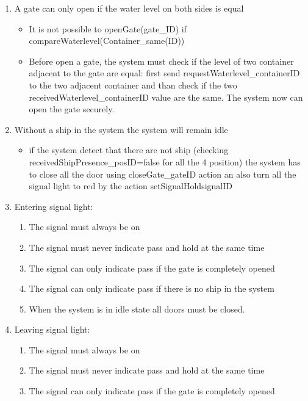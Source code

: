 \begin{enumerate}
	\item A gate can only open if the water level on both sides is equal
	\begin{itemize}
		\item It is not possible to openGate(gate\_ID) if compareWaterlevel(Container\_same(ID))
		\item Before open a gate, the system must check if the level of two container adjacent to the gate are equal: first send requestWaterlevel\_containerID to the two adjacent container and than check if the two receivedWaterlevel\_containerID value are the same. The system now can open the gate securely.
	\end{itemize}
	
	\item Without a ship in the system the system will remain idle
	\begin{itemize}
		\item if the system detect that there are not ship (checking receivedShipPresence\_posID=false for all the 4 position) the system has to close all the door using closeGate\_gateID action an also turn all the signal light to red by the action setSignalHold\-signalID
	\end{itemize}
	
	
	\item Entering signal light:
		\begin{enumerate}
			\item The signal must always be on
			\item The signal must never indicate pass and hold at the same time
			\item The signal can only indicate pass if the gate is completely opened
			\item The signal can only indicate pass if there is no ship in the system
			\item When the system is in idle state all doors must be closed.
			
		\end{enumerate}
	\item Leaving signal light:
		\begin{enumerate}
			\item The signal must always be on
			\item The signal must never indicate pass and hold at the same time
			\item The signal can only indicate pass if the gate is completely opened
		\end{enumerate}
\end{enumerate}
